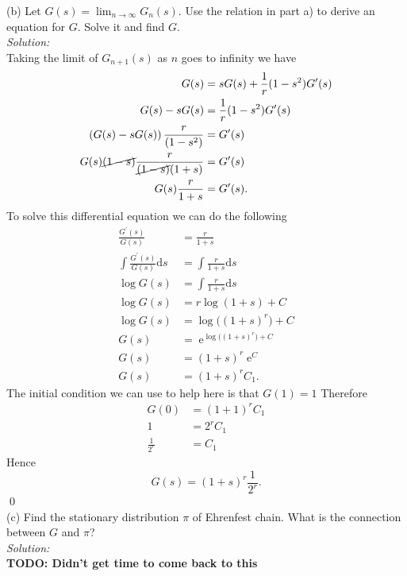 \documentclass[10pt]{amsart}
\newcommand{\D}{\mathrm{d}}
\DeclareMathOperator{\E}{e}
\begin{document}
\noindent
(b) Let $G(s)= \lim_{n \to \infty}  G_n(s)$. Use the relation in part a) to derive an equation for $G$. Solve it and find $G$. \\

\noindent
\textit{Solution:} \\
Taking the limit of $G_{n + 1}(s)$ as $n$ goes to infinity we have
\begin{align*}
G(s) &= sG(s) + \frac 1 r (1 - s^2)G^\prime(s) \\
G(s) - sG(s) &= \frac 1 r (1 - s^2)G^\prime(s) \\
\left(G(s) - sG(s)\right)\frac r {(1 - s^2)}  &= G^\prime(s) \\
G(s) \cancel{(1 - s)}\frac r {\cancel{(1 - s)}(1 + s)}  &= G^\prime(s) \\
G(s) \frac r {1 + s}  &= G^\prime(s).
\end{align*} 
To solve this differential equation we can do the following
\begin{align*}
\frac {G^\prime(s)} {G(s)} &= \frac r {1 + s} \\
\int \frac {G^\prime(s)} {G(s)} \D s&= \int \frac r {1 + s} \D s \\
\log G(s) &= \int \frac r {1 + s} \D s \\
\log G(s) &= r \log(1 + s) + C \\
\log G(s) &= \log\big((1 + s)^r\big) + C \\
G(s) &= \E^{\log\big((1 + s)^r\big) + C} \\
G(s) &= (1 + s)^r\E^C \\
G(s) &= (1 + s)^rC_1.
\end{align*}
The initial condition we can use to help here is that $G(1) = 1$
Therefore
\begin{align*}
G(0) &= (1 + 1)^rC_1 \\
1 &= 2^r C_1 \\
\frac 1 {2^r} &= C_1
\end{align*}
Hence
$$
G(s) = (1 + s)^r \frac 1 {2^r}.
$$
\qed \\

\noindent
(c) Find the stationary distribution $\pi$ of Ehrenfest chain. What is the connection between $G$ and $\pi$? \\

\noindent
\textit{Solution:} \\
\textbf{TODO: Didn't get time to come back to this} \\

\newpage
\end{document}
